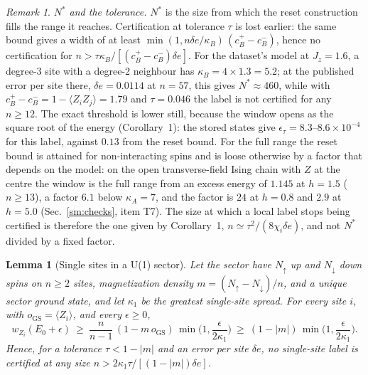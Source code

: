 \documentclass[aps,prx,onecolumn,10pt,nofootinbib,longbibliography,floatfix]{revtex4-2}
\newtheorem{lemma}{Lemma}
\theoremstyle{remark}
\newtheorem*{remark}{Remark}
\newcommand{\Jz}{J_z}
\newcommand{\de}{\delta e}
\newcommand{\GS}{\mathrm{GS}}
\begin{document}
\begin{remark}
\emph{$N^*$ and the tolerance.} $N^*$ is the size from which the reset construction fills the range it reaches.
Certification at tolerance $\tau$ is lost earlier: the same bound gives a width of at least
$\min(1,n\de/\kappa_B)\,(c_B^+-c_B^-)$, hence no certification for $n>\tau\kappa_B/[(c_B^+-c_B^-)\de]$.
For the dataset's model at $\Jz=1.6$, a degree-3 site with a degree-2 neighbour has %
$\kappa_B=4\times1.3=5.2$; at the published error per site there, $\de=0.0114$ at $n=57$, this gives $N^*\approx460$, %
while with $c_B^+-c_B^-=1-\langle Z_iZ_j\rangle=1.79$ and $\tau=0.046$ the label is not certified for any $n\ge12$. %
The exact threshold is lower still, because the window opens as the square root of the energy (Corollary~1): the %
stored states give $\epsilon_\tau=8.3$--$8.6\times10^{-4}$ for this label, against $0.13$ from the reset bound. %
For the full range the reset bound is attained for non-interacting spins and is loose otherwise by a factor that
depends on the model: on the open transverse-field Ising chain with $Z$ at the centre the window is the full range
from an excess energy of $1.145$ at $h=1.5$ ($n\ge13$), a factor $6.1$ below $\kappa_A=7$, and the factor is $24$ at %
$h=0.8$ and $2.9$ at $h=5.0$ (Sec.~\ref{sm:checks}, item T7). The size at which a local label stops being certified %
is therefore the one given by Corollary~1, $n\simeq\tau^2/(8\chi_i\de)$, and not $N^*$ divided by a fixed factor. %
\end{remark}

\begin{lemma}[Single sites in a U(1) sector]
\label{lem:sites}
Let the sector have $N_\uparrow$ up and $N_\downarrow$ down spins on $n\ge2$ sites, magnetization density
$m=(N_\uparrow-N_\downarrow)/n$, and a unique sector ground state, and let $\kappa_1$ be the greatest single-site
spread. For every site $i$, with $o_\GS=\langle Z_i\rangle$, and every $\epsilon\ge0$,
\begin{equation}
w_{Z_i}(E_0+\epsilon)\ \ge\ \frac{n}{n-1}\,(1-m\,o_\GS)\,\min\Big(1,\frac{\epsilon}{2\kappa_1}\Big) %
\ \ge\ (1-|m|)\,\min\Big(1,\frac{\epsilon}{2\kappa_1}\Big). %
\end{equation}
Hence, for a tolerance $\tau<1-|m|$ and an error per site $\de$, no single-site label is certified at any size
$n>2\kappa_1\tau/[(1-|m|)\de]$.
\end{lemma}
\end{document}

